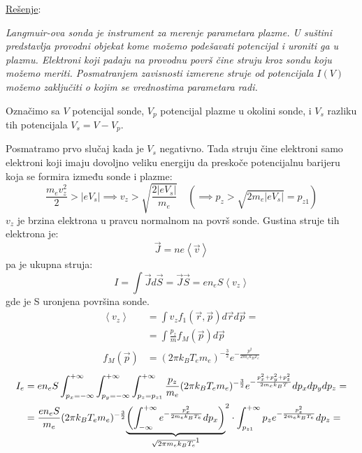\documentclass[fleqn]{report}
\begin{document}
\begin{enumerate}
          \underline{Rešenje}:

          \emph{
              Langmuir-ova sonda je instrument za merenje parametara plazme.
              U suštini predstavlja provodni objekat kome možemo podešavati potencijal i uroniti ga u plazmu.
              Elektroni koji padaju na provodnu površ čine struju kroz sondu koju možemo meriti.
              Posmatranjem zavisnosti izmerene struje od potencijala $I(V)$ možemo zaključiti o kojim se vrednostima parametara radi.
          }

          Označimo sa $V$ potencijal sonde, $V_p$ potencijal plazme u okolini sonde, i $V_s$ razliku tih potencijala $V_s = V - V_p$.

          Posmatramo prvo slučaj kada je $V_s$ negativno.
          Tada struju čine elektroni samo elektroni koji imaju dovoljno veliku energiju da preskoče potencijalnu barijeru koja se formira između sonde i plazme:
          \[ \frac{m_e v_z^2}{2} > |eV_s| \implies v_z > \sqrt{\frac{2|eV_s|}{m_e}} \quad \left(\implies p_z > \sqrt{2m_e|eV_s|} = p_{z1}\right) \]
          $v_z$ je brzina elektrona u pravcu normalnom na površ sonde.
          Gustina struje tih elektrona je:
          \[ \vec{J} = ne\left<\vec{v}\right> \]
          pa je ukupna struja:
          \[ I = \int \vec{J} d\vec{S} = \vec{J} \vec{S} = e n_e S \left<v_z\right> \]
          gde je S uronjena površina sonde.
          \begin{align*}
              \left<v_z\right> & = \int v_z f_1(\vec{r}, \vec{p}) d\vec{r} d\vec{p} =                \\
                               & = \int \frac{p_z}{m} f_M(\vec{p}) d\vec{p}                          \\
              f_M(\vec{p})     & = (2 \pi k_B T_e m_e)^{-\frac{3}{2}} e^{-\frac{p^2}{2 m_e k_B T_e}}
          \end{align*}
          \begin{align*}
              I_e & = e n_e S \int_{p_x = -\infty}^{+\infty} \int_{p_y = -\infty}^{+\infty}\int_{p_z = p_{z1}}^{+\infty} \frac{p_z}{m_e} (2 \pi k_B T_e m_e)^{-\frac{3}{2}} e^{-\frac{p_x^2 + p_y^2 + p_z^2}{2m_e k_B T}} dp_x dp_y dp_z =                                              \\
                  & = \frac{e n_e S}{m_e} (2 \pi k_B T_e m_e)^{-\frac{3}{2}} {\underbrace{\left(\int_{-\infty}^{+\infty} e^{-\frac{p_x^2}{2m_e k_B T_e}} dp_x\right)}_{\sqrt{2\pi m_e k_B T_e}\footnotemark}}^2 \cdot \int_{p_{z1}}^{+\infty} p_z e^{-\frac{p_z^2}{2m_e k_B T_e}}dp_z = \\

\end{align*}
\end{enumerate}
\end{document}
